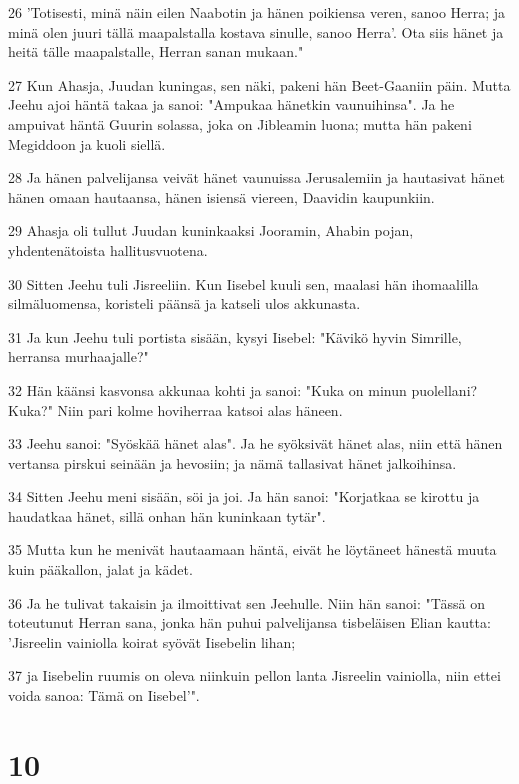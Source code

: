 \par 26 'Totisesti, minä näin eilen Naabotin ja hänen poikiensa veren, sanoo Herra; ja minä olen juuri tällä maapalstalla kostava sinulle, sanoo Herra'. Ota siis hänet ja heitä tälle maapalstalle, Herran sanan mukaan."
\par 27 Kun Ahasja, Juudan kuningas, sen näki, pakeni hän Beet-Gaaniin päin. Mutta Jeehu ajoi häntä takaa ja sanoi: "Ampukaa hänetkin vaunuihinsa". Ja he ampuivat häntä Guurin solassa, joka on Jibleamin luona; mutta hän pakeni Megiddoon ja kuoli siellä.
\par 28 Ja hänen palvelijansa veivät hänet vaunuissa Jerusalemiin ja hautasivat hänet hänen omaan hautaansa, hänen isiensä viereen, Daavidin kaupunkiin.
\par 29 Ahasja oli tullut Juudan kuninkaaksi Jooramin, Ahabin pojan, yhdentenätoista hallitusvuotena.
\par 30 Sitten Jeehu tuli Jisreeliin. Kun Iisebel kuuli sen, maalasi hän ihomaalilla silmäluomensa, koristeli päänsä ja katseli ulos akkunasta.
\par 31 Ja kun Jeehu tuli portista sisään, kysyi Iisebel: "Kävikö hyvin Simrille, herransa murhaajalle?"
\par 32 Hän käänsi kasvonsa akkunaa kohti ja sanoi: "Kuka on minun puolellani? Kuka?" Niin pari kolme hoviherraa katsoi alas häneen.
\par 33 Jeehu sanoi: "Syöskää hänet alas". Ja he syöksivät hänet alas, niin että hänen vertansa pirskui seinään ja hevosiin; ja nämä tallasivat hänet jalkoihinsa.
\par 34 Sitten Jeehu meni sisään, söi ja joi. Ja hän sanoi: "Korjatkaa se kirottu ja haudatkaa hänet, sillä onhan hän kuninkaan tytär".
\par 35 Mutta kun he menivät hautaamaan häntä, eivät he löytäneet hänestä muuta kuin pääkallon, jalat ja kädet.
\par 36 Ja he tulivat takaisin ja ilmoittivat sen Jeehulle. Niin hän sanoi: "Tässä on toteutunut Herran sana, jonka hän puhui palvelijansa tisbeläisen Elian kautta: 'Jisreelin vainiolla koirat syövät Iisebelin lihan;
\par 37 ja Iisebelin ruumis on oleva niinkuin pellon lanta Jisreelin vainiolla, niin ettei voida sanoa: Tämä on Iisebel'".

\chapter{10}

